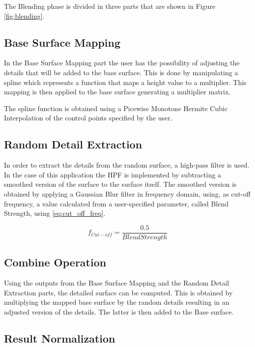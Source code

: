   The Blending phase is divided in three parts that are shown in Figure \ref{fig:blending}. 
  
  \subsection {Base Surface Mapping}
  
	In the Base Surface Mapping part the user has the possibility of adjusting the details that will be added to the base surface. This is done by manipulating a spline which represents a function that maps a height value to a multiplier. This mapping is then applied to the base surface generating a multiplier matrix.
	
	The spline function is obtained using a Picewise Monotone Hermite Cubic Interpolation of the control points specified by the user. 
    
  \subsection{Random Detail Extraction}

	In order to extract the details from the random surface, a high-pass filter is used. In the case of this application the HPF is implemented by subtracting a smoothed version of the surface to the surface itself. The smoothed version is obtained by applying a Gaussian Blur filter in frequency domain, using, as cut-off frequency, a value calculated from a user-specified parameter, called Blend Strength, using \ref{eq:cut_off_freq}.
	
	\begin{equation} \label{eq:cut_off_freq}
	  f_{Cut-off} = \frac{0.5}{BlendStrength}
	\end{equation}
      
  \subsection{Combine Operation}
  
    Using the outputs from the Base Surface Mapping and the Random Detail Extraction parts, the detailed surface can be computed. This is obtained by multiplying the mapped base surface by the random details resulting in an adjusted version of the details. The latter is then added to the Base surface.
      
  \subsection{Result Normalization}
  
